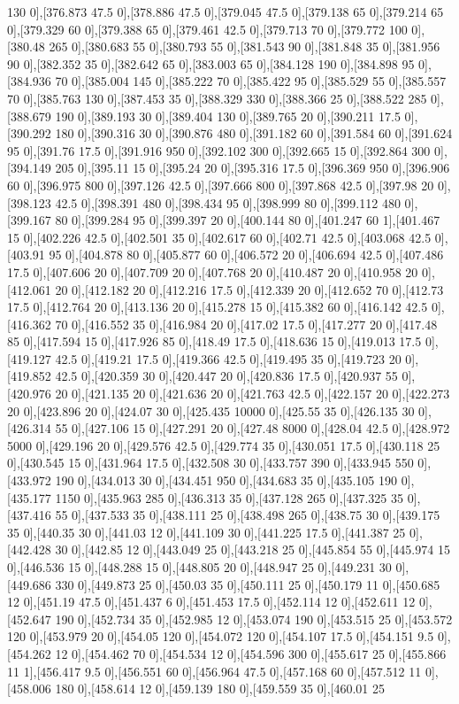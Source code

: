 {130 0],[376.873 47.5 0],[378.886 47.5 0],[379.045 47.5 0],[379.138 65 0],[379.214 65 0],[379.329 60 0],[379.388 65 0],[379.461 42.5 0],[379.713 70 0],[379.772 100 0],[380.48 265 0],[380.683 55 0],[380.793 55 0],[381.543 90 0],[381.848 35 0],[381.956 90 0],[382.352 35 0],[382.642 65 0],[383.003 65 0],[384.128 190 0],[384.898 95 0],[384.936 70 0],[385.004 145 0],[385.222 70 0],[385.422 95 0],[385.529 55 0],[385.557 70 0],[385.763 130 0],[387.453 35 0],[388.329 330 0],[388.366 25 0],[388.522 285 0],[388.679 190 0],[389.193 30 0],[389.404 130 0],[389.765 20 0],[390.211 17.5 0],[390.292 180 0],[390.316 30 0],[390.876 480 0],[391.182 60 0],[391.584 60 0],[391.624 95 0],[391.76 17.5 0],[391.916 950 0],[392.102 300 0],[392.665 15 0],[392.864 300 0],[394.149 205 0],[395.11 15 0],[395.24 20 0],[395.316 17.5 0],[396.369 950 0],[396.906 60 0],[396.975 800 0],[397.126 42.5 0],[397.666 800 0],[397.868 42.5 0],[397.98 20 0],[398.123 42.5 0],[398.391 480 0],[398.434 95 0],[398.999 80 0],[399.112 480 0],[399.167 80 0],[399.284 95 0],[399.397 20 0],[400.144 80 0],[401.247 60 1],[401.467 15 0],[402.226 42.5 0],[402.501 35 0],[402.617 60 0],[402.71 42.5 0],[403.068 42.5 0],[403.91 95 0],[404.878 80 0],[405.877 60 0],[406.572 20 0],[406.694 42.5 0],[407.486 17.5 0],[407.606 20 0],[407.709 20 0],[407.768 20 0],[410.487 20 0],[410.958 20 0],[412.061 20 0],[412.182 20 0],[412.216 17.5 0],[412.339 20 0],[412.652 70 0],[412.73 17.5 0],[412.764 20 0],[413.136 20 0],[415.278 15 0],[415.382 60 0],[416.142 42.5 0],[416.362 70 0],[416.552 35 0],[416.984 20 0],[417.02 17.5 0],[417.277 20 0],[417.48 85 0],[417.594 15 0],[417.926 85 0],[418.49 17.5 0],[418.636 15 0],[419.013 17.5 0],[419.127 42.5 0],[419.21 17.5 0],[419.366 42.5 0],[419.495 35 0],[419.723 20 0],[419.852 42.5 0],[420.359 30 0],[420.447 20 0],[420.836 17.5 0],[420.937 55 0],[420.976 20 0],[421.135 20 0],[421.636 20 0],[421.763 42.5 0],[422.157 20 0],[422.273 20 0],[423.896 20 0],[424.07 30 0],[425.435 10000 0],[425.55 35 0],[426.135 30 0],[426.314 55 0],[427.106 15 0],[427.291 20 0],[427.48 8000 0],[428.04 42.5 0],[428.972 5000 0],[429.196 20 0],[429.576 42.5 0],[429.774 35 0],[430.051 17.5 0],[430.118 25 0],[430.545 15 0],[431.964 17.5 0],[432.508 30 0],[433.757 390 0],[433.945 550 0],[433.972 190 0],[434.013 30 0],[434.451 950 0],[434.683 35 0],[435.105 190 0],[435.177 1150 0],[435.963 285 0],[436.313 35 0],[437.128 265 0],[437.325 35 0],[437.416 55 0],[437.533 35 0],[438.111 25 0],[438.498 265 0],[438.75 30 0],[439.175 35 0],[440.35 30 0],[441.03 12 0],[441.109 30 0],[441.225 17.5 0],[441.387 25 0],[442.428 30 0],[442.85 12 0],[443.049 25 0],[443.218 25 0],[445.854 55 0],[445.974 15 0],[446.536 15 0],[448.288 15 0],[448.805 20 0],[448.947 25 0],[449.231 30 0],[449.686 330 0],[449.873 25 0],[450.03 35 0],[450.111 25 0],[450.179 11 0],[450.685 12 0],[451.19 47.5 0],[451.437 6 0],[451.453 17.5 0],[452.114 12 0],[452.611 12 0],[452.647 190 0],[452.734 35 0],[452.985 12 0],[453.074 190 0],[453.515 25 0],[453.572 120 0],[453.979 20 0],[454.05 120 0],[454.072 120 0],[454.107 17.5 0],[454.151 9.5 0],[454.262 12 0],[454.462 70 0],[454.534 12 0],[454.596 300 0],[455.617 25 0],[455.866 11 1],[456.417 9.5 0],[456.551 60 0],[456.964 47.5 0],[457.168 60 0],[457.512 11 0],[458.006 180 0],[458.614 12 0],[459.139 180 0],[459.559 35 0],[460.01 25 }
